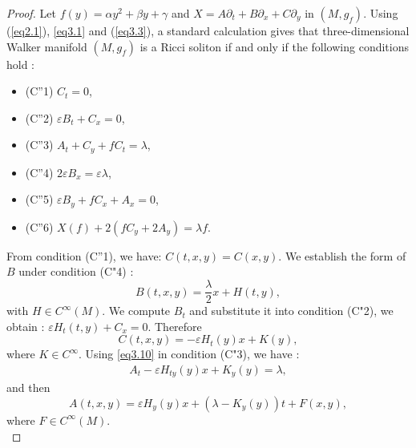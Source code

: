 \documentclass[reqno, 12pt]{amsart}
\numberwithin{equation}{section}
\begin{document}
\begin{proof}
Let $f(y)=\alpha y^{2}+\beta y+\gamma$ and 
$X = A\partial_t+ B\partial_x + C \partial_y $ in $(M, g_f)$.  Using (\ref{eq2.1}),  \eqref{eq3.1} and (\ref{eq3.3}), a standard calculation gives that three-dimensional 
Walker manifold $(M,g_f)$ is a Ricci soliton if and only if the following conditions hold :
\begin{itemize}
\item (C''1) $C_t= 0$,  
\item (C''2) $\varepsilon B_t +C_x= 0$,  
\item (C''3) $A_t +C_y +fC_t=\lambda$,  
\item (C''4) $2\varepsilon B_x=\varepsilon\lambda$,  
\item (C''5) $\varepsilon B_y +fC_x +A_x=0$,  
\item (C''6) $ X(f)+2\left( fC_y+2A_y\right)  =\lambda f$. 
\end{itemize}
From condition (C''1), we have: $C(t,x,y) = C(x,y)$. We establish the form of $B$ 
under condition (C"4) :
\begin{equation}\label{eq3.9}
B(t,x,y)= \frac{\lambda}{2}x + H(t,y),
\end{equation}
with $H \in C^{\infty}(M)$. We compute $B_t$ and substitute it into condition (C"2), 
we obtain : $\varepsilon H_{t}(t,y) + C_{x}=0$. Therefore
\begin{equation}\label{eq3.10}
	C(t,x,y)=-\varepsilon H_{t}(y)x + K(y),
\end{equation}
where $K\in C^{\infty}$. Using \eqref{eq3.10} in condition (C"3), we have :
\begin{eqnarray*}
A_t -\varepsilon H_{ty}(y)x + K_{y}(y) = \lambda,
\end{eqnarray*} 
and then
\begin{equation}\label{eq3.11}
A(t,x,y)=\varepsilon H_{y}(y)x+\left( \lambda-K_{y}(y)\right) t + F(x,y),
\end{equation}
where $F\in C^{\infty}(M)$. \\


\end{proof}
\end{document}
